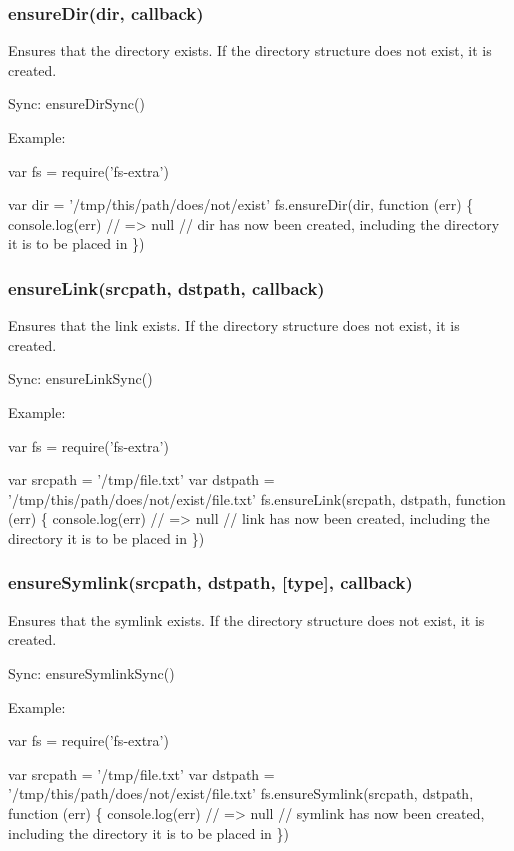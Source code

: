 \subsubsection*{ensure\+Dir(dir, callback)}

Ensures that the directory exists. If the directory structure does not exist, it is created.

Sync\+: {\ttfamily ensure\+Dir\+Sync()}

Example\+:


\begin{DoxyCode}
var fs = require('fs-extra')

var dir = '/tmp/this/path/does/not/exist'
fs.ensureDir(dir, function (err) \{
  console.log(err) // => null
  // dir has now been created, including the directory it is to be placed in
\})
\end{DoxyCode}


\subsubsection*{ensure\+Link(srcpath, dstpath, callback)}

Ensures that the link exists. If the directory structure does not exist, it is created.

Sync\+: {\ttfamily ensure\+Link\+Sync()}

Example\+:


\begin{DoxyCode}
var fs = require('fs-extra')

var srcpath = '/tmp/file.txt'
var dstpath = '/tmp/this/path/does/not/exist/file.txt'
fs.ensureLink(srcpath, dstpath, function (err) \{
  console.log(err) // => null
  // link has now been created, including the directory it is to be placed in
\})
\end{DoxyCode}


\subsubsection*{ensure\+Symlink(srcpath, dstpath, \mbox{[}type\mbox{]}, callback)}

Ensures that the symlink exists. If the directory structure does not exist, it is created.

Sync\+: {\ttfamily ensure\+Symlink\+Sync()}

Example\+:


\begin{DoxyCode}
var fs = require('fs-extra')

var srcpath = '/tmp/file.txt'
var dstpath = '/tmp/this/path/does/not/exist/file.txt'
fs.ensureSymlink(srcpath, dstpath, function (err) \{
  console.log(err) // => null
  // symlink has now been created, including the directory it is to be placed in
\})
\end{DoxyCode}



